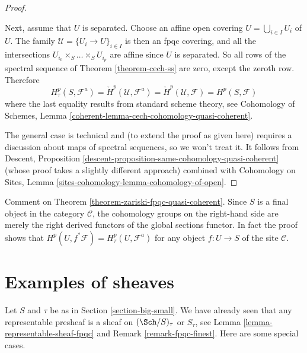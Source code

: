 \begin{proof}
\begin{enumerate}
\end{enumerate}
Next, assume that $U$ is separated. Choose an affine open covering
$U = \bigcup_{i \in I} U_i$ of $U$. The family
$\mathcal{U} = \{U_i \to U\}_{i \in I}$ is then an fpqc covering,
and all the intersections
$U_{i_0} \times_S \ldots \times_S U_{i_p}$ are affine
since $U$ is separated. So all rows of the spectral sequence of
Theorem \ref{theorem-cech-ss}
are zero, except the zeroth row. Therefore
$$
H^p_\tau(S, \mathcal{F}^a) =
\check H^p(\mathcal{U}, \mathcal{F}^a) =
\check H^p(\mathcal{U}, \mathcal{F}) = H^p(S, \mathcal{F})
$$
where the last equality results from standard scheme theory, see
Cohomology of Schemes, Lemma
\ref{coherent-lemma-cech-cohomology-quasi-coherent}.

\medskip\noindent
The general case is technical and (to extend the proof as given here)
requires a discussion about maps of spectral sequences, so we won't treat it.
It follows from
Descent, Proposition \ref{descent-proposition-same-cohomology-quasi-coherent}
(whose proof takes a slightly different approach) combined with
Cohomology on Sites, Lemma \ref{sites-cohomology-lemma-cohomology-of-open}.
\end{proof}

\begin{remark}
\label{remark-right-derived-global-sections}
Comment on Theorem \ref{theorem-zariski-fpqc-quasi-coherent}.
Since $S$ is a final object in the category $\mathcal{C}$, the cohomology
groups on the right-hand side are merely the right derived functors of the
global sections functor. In fact the proof shows that
$H^p(U, f^*\mathcal{F}) = H^p_\tau(U, \mathcal{F}^a)$
for any object $f : U \to S$ of the site $\mathcal{C}$.
\end{remark}





\section{Examples of sheaves}
\label{section-examples-sheaves}

\noindent
Let $S$ and $\tau$ be as in Section \ref{section-big-small}.
We have already seen that any representable presheaf is a sheaf on
$(\Sch/S)_\tau$ or $S_\tau$, see
Lemma \ref{lemma-representable-sheaf-fpqc}
and
Remark \ref{remark-fpqc-finest}.
Here are some special cases.

